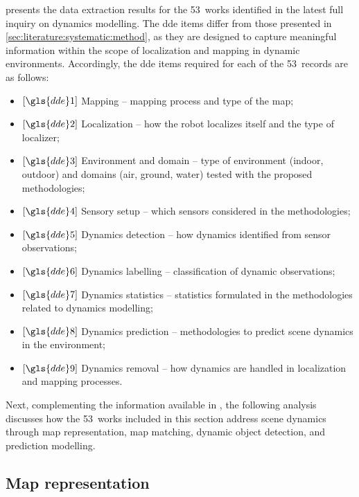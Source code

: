  presents the data extraction results
for the 53~works identified in the latest full inquiry
on dynamics modelling. The \gls{dde} items differ from those presented in
\ref{sec:literature:systematic:method}, as they are designed to capture
meaningful information within the scope of localization and mapping in
dynamic environments. Accordingly, the \gls{dde} items required for each of
the 53~records are as follows:
\begin{itemize}
\item $\left[\gls{dde}1\right]$ Mapping -- mapping process and type of the map;
\item $\left[\gls{dde}2\right]$ Localization -- how the robot localizes itself
and the type of localizer;
\item $\left[\gls{dde}3\right]$ Environment and domain -- type of environment
(indoor, outdoor) and domains (air, ground, water) tested with
the proposed methodologies;
\item $\left[\gls{dde}4\right]$ Sensory setup -- which sensors considered in the
methodologies;
\item $\left[\gls{dde}5\right]$ Dynamics detection -- how dynamics
identified from sensor observations;
\item $\left[\gls{dde}6\right]$ Dynamics labelling -- classification of dynamic
observations;
\item $\left[\gls{dde}7\right]$ Dynamics statistics -- statistics formulated
in the methodologies related to dynamics modelling;
\item $\left[\gls{dde}8\right]$ Dynamics prediction -- methodologies to predict
scene dynamics in the environment;
\item $\left[\gls{dde}9\right]$ Dynamics removal -- how dynamics are handled in
localization and mapping processes.
\end{itemize}

Next, complementing the information available in
, the following analysis discusses
how the 53~works included in this section address scene dynamics through map representation, map matching, dynamic object detection, and
prediction modelling.



\subsection{Map representation}

